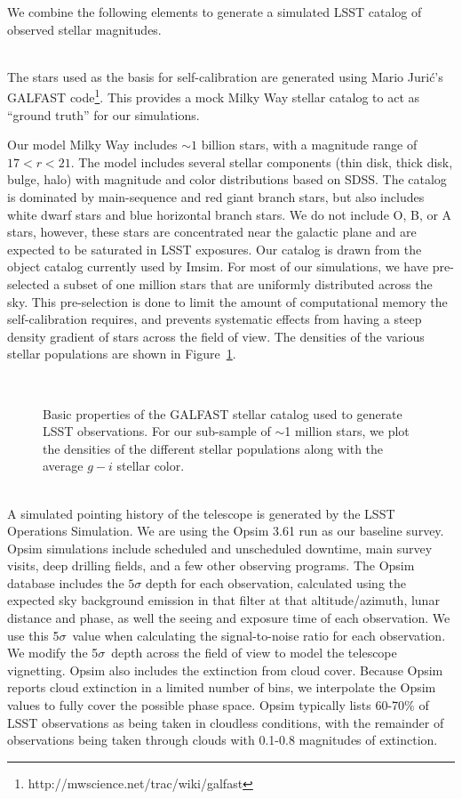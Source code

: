 \documentclass[12pt,preprint]{aastex}
\begin{document}
We combine the following elements to generate a simulated LSST catalog of observed stellar magnitudes.

\\
The stars used as the basis for self-calibration are generated using Mario Juri\'{c}'s GALFAST code\footnote{ http://mwscience.net/trac/wiki/galfast}.  This provides a mock Milky Way stellar catalog to act as ``ground truth'' for our simulations.  

Our model Milky Way includes $\sim1$ billion stars, with a magnitude range of $17 < r < 21$.  The model includes several stellar components (thin disk, thick disk, bulge, halo) with magnitude and color distributions based on SDSS. The catalog is dominated by main-sequence and red giant branch stars, but also includes white dwarf stars and blue horizontal branch stars.  We do not include O, B, or A stars, however, these stars are concentrated near the galactic plane and are expected to be saturated in LSST exposures.  Our catalog is drawn from the object catalog currently used by Imsim.  For most of our simulations, we have pre-selected a subset of one million stars that are uniformly distributed across the sky.  This pre-selection is done to limit the amount of computational memory the self-calibration requires, and prevents systematic effects from having a steep density gradient of stars across the field of view.  The densities of the various stellar populations are shown in Figure~\ref{fig:gfpop}.


\begin{figure}
\\
\caption{Basic properties of the GALFAST stellar catalog used to generate LSST observations.  For our sub-sample of $\sim$1 million stars, we plot the densities of the different stellar populations along with the average $g-i$ stellar color.\label{fig:gfpop}}
\end{figure}


\\
A simulated pointing history of the telescope is generated by the LSST Operations Simulation. We are using the Opsim 3.61 run as our baseline survey.  Opsim simulations include scheduled and unscheduled downtime, main survey visits, deep drilling fields, and a few other observing programs. The Opsim database includes the $5\sigma$ depth for each observation, calculated using the expected sky background emission in that filter at that altitude/azimuth, lunar distance and phase, as well the seeing and exposure time of each observation.  We use this 5$\sigma$\ value when calculating the signal-to-noise ratio for each observation.  We modify the 5$\sigma$\ depth across the field of view to model the telescope vignetting.  Opsim also includes the extinction from cloud cover.  Because Opsim reports cloud extinction in a limited number of bins, we interpolate the Opsim values to fully cover the possible phase space.  Opsim typically lists 60-70\% of LSST observations as being taken in cloudless conditions, with the remainder of observations being taken through clouds with 0.1-0.8 magnitudes of extinction.  
\end{document}
